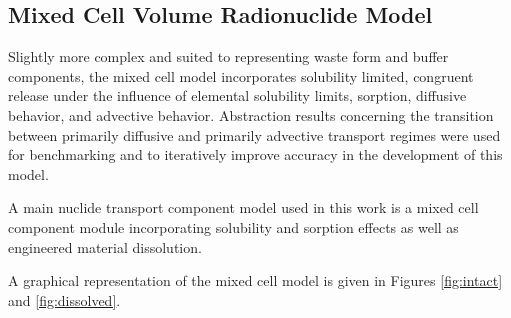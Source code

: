 \subsection*{Mixed Cell Volume Radionuclide Model}\label{sec:mixed_cell}
Slightly more complex and suited to representing waste form and buffer 
components, the mixed cell model incorporates solubility limited, congruent 
release under the influence of elemental solubility limits, sorption, diffusive 
behavior, and advective behavior. Abstraction results concerning the 
transition between primarily diffusive and primarily advective transport regimes 
were used for benchmarking and to iteratively improve accuracy in the development 
of this model.

A main nuclide transport component model used in this work is a mixed cell 
component module incorporating solubility and sorption effects as well as  
engineered material dissolution.

A graphical representation of the mixed cell model is given in Figures 
\ref{fig:intact} and \ref{fig:dissolved}.  

